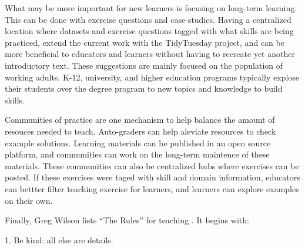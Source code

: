 \documentclass[../main.tex]{subfiles}
\begin{document}
What may be more important for new learners is focusing on long-term learning.
This can be done with exercise questions and case-studies.
Having a centralized location where datasets and exercise questions tagged with what skills are being practiced,
extend the current work with the TidyTuesday project,
and can be more beneficial to educators and learners without having to recreate yet another
introductory text.
These suggestions are mainly focused on the population of working adults.
K-12, university, and higher education programs typically explose their students
over the degree program to new topics and knowledge to build skills.

Communities of practice are one mechanism to help balance the amount of resouces needed to teach.
Auto-graders can help aleviate resources to check example solutions.
Learning materials can be published in an open source platform,
and communities can work on the long-term maintence of these materials.
These communities can also be centralized hubs where exercises can be posted.
If these exercises were taged with skill and domain information,
educators can bettter filter teaching exercise for learners,
and learners can explore examples on their own.

Finally, Greg Wilson lists ``The Rules'' for teaching \cite{wilson2019teaching}.
It begins with:

\begin{displayquote}
    1. Be kind: all else are details.
\end{displayquote}
\end{document}
